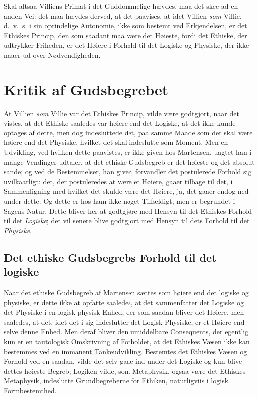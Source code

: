 \documentclass[12pt,a4paper]{book}
\newcommand{\opage}[1]{\marginnote{\footnotesize\textit{[#1]}}}
\begin{document}
Skal altsaa Villiens Primat i det Guddommelige hævdes, maa det skee ad en anden
Vei: det maa hævdes derved, at det paavises, at idet Villien \emph{som} Villie,
d.\ v.\ s. i sin oprindelige Autonomie, ikke som bestemt ved Erkjendelsen, er det
Ethiskes Princip, den som saadant maa være det Høieste, fordi det Ethiske, der
udtrykker Friheden, er det Høiere i Forhold til det Logiske og Physiske, der ikke
naaer ud over Nødvendigheden.

\section{Kritik af Gudsbegrebet}
\label{sec:gudsbegreb}

At Villien \emph{som} Villie var det Ethiskes Princip, vilde være godtgjort, naar det
vistes, at det Ethiske saaledes var høiere end det Logiske, at det ikke kunde
optages af dette, men dog indesluttede det, paa samme Maade som det skal \opage{58}være
høiere end det Physiske, hvilket det skal indeslutte som Moment. Men en Udvikling,
ved hvilken dette paavistes, er ikke given hos Martensen, uagtet han i mange
Vendinger udtaler, at det ethiske Gudsbegreb er det høieste og det absolut sande;
og ved de Bestemmelser, han giver, forvandler det postulerede Forhold sig uvilkaarligt: det, der postuleredes at være et Høiere, gaaer tilbage til det, i
Sammenligning med hvilket det skulde være det Høiere, ja, det gaaer endog ned under
dette. Og dette er hos ham ikke noget Tilfældigt, men er begrundet i Sagens Natur.
Dette bliver her at godtgjøre med Hensyn til det Ethiskes Forhold til det \emph{Logiske}; det vil senere blive godtgjort med Hensyn til dets Forhold til det \emph{Physiske}.

\subsection{Det ethiske Gudsbegrebs Forhold til det logiske}
\label{ssec:ethisk-logisk}

Naar det ethiske Gudsbegreb af Martensen sættes som høiere end det logiske og
physiske, er dette ikke at opfatte saaledes, at det sammenfatter det Logiske og det
Physiske i en logisk-physisk Enhed, der som saadan bliver det Høiere, men saaledes,
at det, idet det i sig indeslutter det Logisk-Physiske, er et Høiere end selve denne
Enhed. Men deraf bliver den umiddelbare Consequents, der egentlig kun er en
tautologisk Omskrivning af Forholdet, at det Ethiskes Væsen ikke kan bestemmes ved
en immanent Tankeudvikling. Bestemtes det Ethiskes Væsen og Forhold ved en saadan,
vilde det selv gaae ind under det Logiske og kun blive dettes høieste Begreb;
Logiken vilde, som Metaphysik, ogsaa være det Ethiskes Metaphysik, indeslutte
Grundbegreberne for Ethiken, naturligviis i logisk Formbestemthed.
\end{document}
